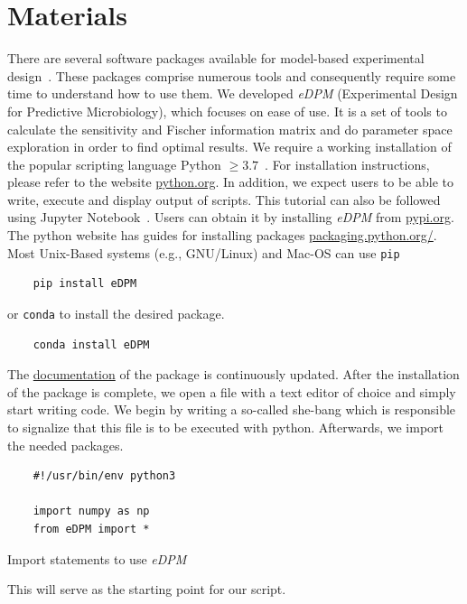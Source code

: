 \documentclass[graybox]{svmult}
\begin{document}
\section{Materials}
There are several software packages available for model-based experimental design~\cite{balsa-canto_amigo2_2016, zhang_optimal_2018, busetto_near-optimal_2013}.
These packages comprise numerous tools and consequently require some time to understand how to use them.
We developed {\it eDPM} (Experimental Design for Predictive Microbiology), which focuses on ease of use.
It is a set of tools to calculate the sensitivity and Fischer information matrix and do parameter space exploration in order to find optimal results.
We require a working installation of the popular scripting language Python $\geq3.7$~\cite{rossumPythonLanguageReference2010}.
For installation instructions, please refer to the website \href{https://www.python.org/downloads/}{python.org}.
In addition, we expect users to be able to write, execute and display output of scripts.
This tutorial can also be followed using Jupyter Notebook~\cite{jupyterteamJupyterNotebook}.
%
Users can obtain it by installing {\it eDPM} from \href{https://pypi.org/project/edpm/0.0.1/}{pypi.org}.
The python website has guides for installing packages \href{https://packaging.python.org/en/latest/tutorials/installing-packages/}{packaging.python.org/}.
Most Unix-Based systems (e.g., GNU/Linux) and Mac-OS can use \texttt{pip}
\begin{verbatim}
    pip install eDPM
\end{verbatim}
or \texttt{conda} to install the desired package.
\begin{verbatim}
    conda install eDPM
\end{verbatim}
The \href{https://spatial-systems-biology-freiburg.github.io/eDPM/}{documentation} of the package is continuously updated.
After the installation of the package is complete, we open a file with a text editor of choice and simply start writing code.
We begin by writing a so-called she-bang which is responsible to signalize that this file is to be executed with python.
Afterwards, we import the needed packages.
\begin{code}[h]
    \begin{verbatim}
    #!/usr/bin/env python3

    import numpy as np
    from eDPM import *
    \end{verbatim}
    \caption{Import statements to use {\it eDPM}}
    \label{code:import_statements}
\end{code}
This will serve as the starting point for our script.
\end{document}
